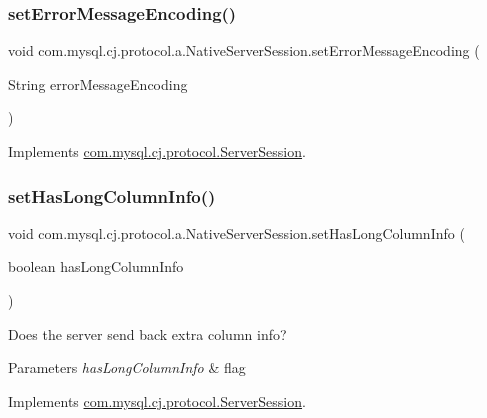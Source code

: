 \subsubsection{\texorpdfstring{set\+Error\+Message\+Encoding()}{setErrorMessageEncoding()}}
{\footnotesize\ttfamily void com.\+mysql.\+cj.\+protocol.\+a.\+Native\+Server\+Session.\+set\+Error\+Message\+Encoding (\begin{DoxyParamCaption}\item[{String}]{error\+Message\+Encoding }\end{DoxyParamCaption})}



Implements \mbox{\hyperlink{interfacecom_1_1mysql_1_1cj_1_1protocol_1_1_server_session_a05ff2ff3c3265cb245ca9f1ff708d457}{com.\+mysql.\+cj.\+protocol.\+Server\+Session}}.

\mbox{\label{classcom_1_1mysql_1_1cj_1_1protocol_1_1a_1_1_native_server_session_ab7e6639fd06a4d47ab35e3cd89dfc10a}} 
\subsubsection{\texorpdfstring{set\+Has\+Long\+Column\+Info()}{setHasLongColumnInfo()}}
{\footnotesize\ttfamily void com.\+mysql.\+cj.\+protocol.\+a.\+Native\+Server\+Session.\+set\+Has\+Long\+Column\+Info (\begin{DoxyParamCaption}\item[{boolean}]{has\+Long\+Column\+Info }\end{DoxyParamCaption})}

Does the server send back extra column info?


\begin{DoxyParams}{Parameters}
{\em has\+Long\+Column\+Info} & flag \\
\hline
\end{DoxyParams}


Implements \mbox{\hyperlink{interfacecom_1_1mysql_1_1cj_1_1protocol_1_1_server_session_a004d9939fa7471ce08e0b404363642fc}{com.\+mysql.\+cj.\+protocol.\+Server\+Session}}.

